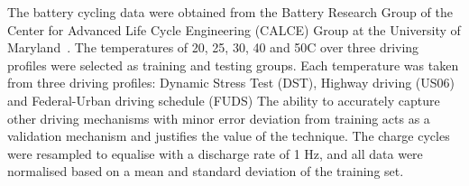 %
%
The battery cycling data were obtained from the Battery Research Group of the
Center for Advanced Life Cycle Engineering (CALCE) Group
at the University of Maryland~\cite{noauthor_calce_2017}.
The temperatures of 20, 25, 30, 40 and 50\textdegree{}C over three driving profiles were selected as training and testing groups.
Each temperature was taken from three driving profiles: Dynamic Stress Test (DST), Highway driving (US06) and Federal-Urban driving schedule (FUDS)
The ability to accurately capture other driving mechanisms with minor error deviation from training acts as a validation mechanism and justifies the value of the technique.
The charge cycles were resampled to equalise with a discharge rate of 1 Hz, and all data were normalised based on a mean and standard deviation of the training set.

